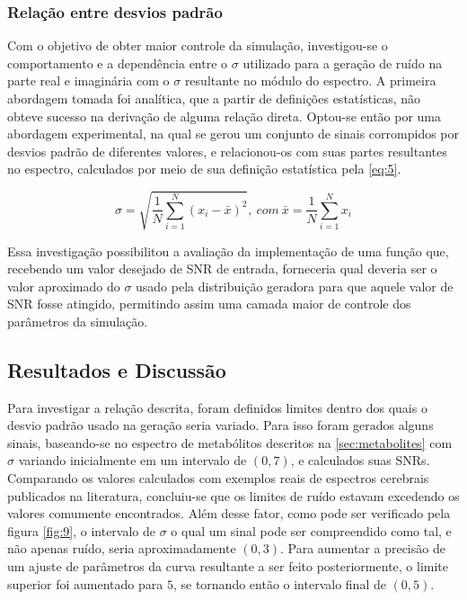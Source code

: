 \documentclass[12pt]{article}
\begin{document}
\subsubsection{Relação entre desvios padrão}

Com o objetivo de obter maior controle da simulação, investigou-se o comportamento e a dependência entre o $\sigma$ utilizado para a geração de ruído na parte real e imaginária com o $\sigma$ resultante no módulo do espectro. A primeira abordagem 
tomada foi analítica, que a partir de definições estatísticas, não obteve sucesso na derivação de alguma relação direta. Optou-se então por uma abordagem experimental, na qual se gerou um conjunto de sinais 
corrompidos por desvios padrão de diferentes valores, e relacionou-os com suas partes resultantes no espectro, calculados por meio de sua definição 
estatística pela \autoref{eq:5}.

\begin{equation} \label{eq:5}
    \sigma = \sqrt{\frac{1}{N} \sum_{i=1}^{N} (x_i - \bar{x})^2}, \ com \ \bar{x} = \frac{1}{N} \sum_{i = 1}^{N} x_i  
\end{equation}

Essa investigação possibilitou a avaliação da implementação de uma função que, recebendo um valor desejado de SNR de entrada, forneceria qual deveria ser o valor aproximado do $\sigma$ usado pela distribuição 
geradora para que aquele valor de SNR fosse atingido, permitindo assim uma camada maior de controle dos parâmetros da simulação.

\subsection{Resultados e Discussão}

Para investigar a relação descrita, foram definidos limites dentro dos quais o desvio padrão usado na geração seria variado. Para isso foram gerados alguns sinais, baseando-se no espectro de metabólitos descritos na \autoref{sec:metabolites} com $\sigma$ variando inicialmente em um intervalo de $(0, 7)$, e calculados suas SNRs.
Comparando os valores calculados com exemplos reais de espectros cerebrais publicados na literatura, concluiu-se que os limites de ruído estavam excedendo os valores comumente encontrados. Além desse fator, como pode ser verificado pela figura \autoref{fig:9}, o intervalo de $\sigma$ o qual um sinal pode ser compreendido como tal, e não apenas ruído, seria aproximadamente $(0, 3)$. Para aumentar a precisão de um ajuste de parâmetros da 
curva resultante a ser feito posteriormente, o limite superior foi aumentado para $5$, se tornando então o intervalo final de $(0, 5)$.
\end{document}
